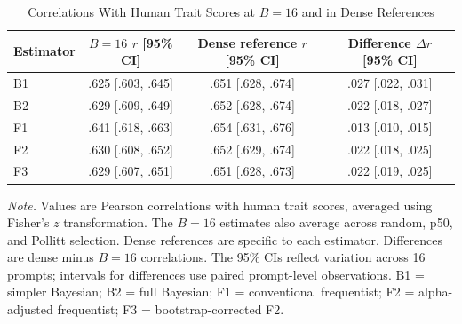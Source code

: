 
\begin{table}[htbp]
\centering
\caption{Correlations With Human Trait Scores at $B=16$ and in Dense References}
\label{tab:rq3-human}
\small
\setlength{\tabcolsep}{4pt}
\begin{tabular}{@{}lccc@{}}
\toprule
Estimator &
\shortstack{$B=16$\\$r$ [95\% CI]} &
\shortstack{Dense reference\\$r$ [95\% CI]} &
\shortstack{Difference\\$\Delta r$ [95\% CI]} \\
\midrule
B1 & .625 [.603, .645] & .651 [.628, .674] & .027 [.022, .031] \\
B2 & .629 [.609, .649] & .652 [.628, .674] & .022 [.018, .027] \\
F1 & .641 [.618, .663] & .654 [.631, .676] & .013 [.010, .015] \\
F2 & .630 [.608, .652] & .652 [.629, .674] & .022 [.018, .025] \\
F3 & .629 [.607, .651] & .651 [.628, .673] & .022 [.019, .025] \\
\bottomrule
\end{tabular}
\par\smallskip
\begin{minipage}{\linewidth}
\footnotesize
\textit{Note.} Values are Pearson correlations with human trait scores,
averaged using Fisher's $z$ transformation. The $B=16$ estimates also
average across random, p50, and Pollitt selection. Dense
references are specific to each estimator. Differences are dense minus
$B=16$ correlations. The 95\% CIs reflect variation across 16 prompts;
intervals for differences use paired prompt-level observations.
B1 = simpler Bayesian; B2 = full Bayesian;
F1 = conventional frequentist; F2 = alpha-adjusted frequentist;
F3 = bootstrap-corrected F2.
\end{minipage}
\end{table}
